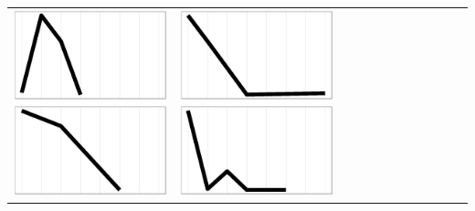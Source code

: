 \documentclass[conference]{IEEEtran}
\begin{document}
\begin{table}
\begin{tabular}{ | b{1.5cm} | c | c | c | c | c | c | c | c | c | c | c |}
 \includegraphics[scale=0.08]{figures/ccaa.ps} &  
 \includegraphics[scale=0.08]{figures/cbaa.ps} &  

\end{tabular}
\end{table}
\end{document}
